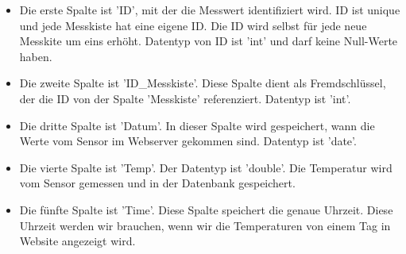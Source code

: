 	\begin{itemize}
		\item Die erste Spalte ist 'ID', mit der die Messwert identifiziert wird. ID ist unique und jede Messkiste hat eine eigene ID. Die ID wird selbst f\"ur jede neue Messkite um eins erh\"oht. Datentyp von ID ist 'int' und darf keine Null-Werte haben. 
		\item Die zweite Spalte ist 'ID\_Messkiste'. Diese Spalte dient als Fremdschl\"ussel, der die ID von der Spalte 'Messkiste' referenziert. Datentyp ist 'int'.
		\item Die dritte Spalte ist 'Datum'. In dieser Spalte wird gespeichert, wann die Werte vom Sensor im Webserver gekommen sind. Datentyp ist 'date'.
		\item Die vierte Spalte ist 'Temp'. Der Datentyp ist 'double'. Die Temperatur wird vom Sensor gemessen und in der Datenbank gespeichert.
		\item Die f\"unfte Spalte ist 'Time'. Diese Spalte speichert die genaue Uhrzeit. Diese Uhrzeit werden wir brauchen, wenn wir die Temperaturen von einem Tag in Website angezeigt wird.  
	\end{itemize}
